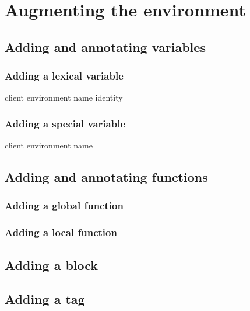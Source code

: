 \chapter{Augmenting the environment}

\section{Adding and annotating variables}

\subsection{Adding a lexical variable}

 {client environment name \optional identity}

\subsection{Adding a special variable}

 {client environment name}

\section{Adding and annotating functions}

\subsection{Adding a global function}

\subsection{Adding a local function}

\section{Adding a block}

\section{Adding a tag}

